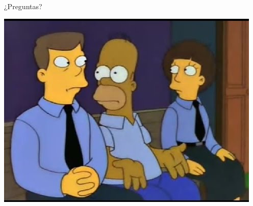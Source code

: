 \documentclass{beamer}
\begin{document}
\begin{frame}{¿Preguntas?}
	\begin{center}
		\includegraphics[scale=0.4]{homero-pelicula.jpg}
	\end{center}
\end{frame}
\end{document}

